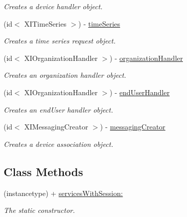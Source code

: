 \begin{DoxyCompactItemize}
\begin{DoxyCompactList}\small\item\em Creates a device handler object. \end{DoxyCompactList}\item 
(id$<$ X\+I\+Time\+Series $>$) -\/ \hyperlink{interface_x_i_session_services_internal_ac3c66084f71a5c2f7d2600b8bcb6c8c1}{time\+Series}
\begin{DoxyCompactList}\small\item\em Creates a time series request object. \end{DoxyCompactList}\item 
(id$<$ X\+I\+Organization\+Handler $>$) -\/ \hyperlink{interface_x_i_session_services_internal_a1f4dff26e7d2c196d5c71f98abff19de}{organization\+Handler}
\begin{DoxyCompactList}\small\item\em Creates an organization handler object. \end{DoxyCompactList}\item 
(id$<$ X\+I\+Organization\+Handler $>$) -\/ \hyperlink{interface_x_i_session_services_internal_af6e364386121abc42ca21dcada112fd5}{end\+User\+Handler}
\begin{DoxyCompactList}\small\item\em Creates an end\+User handler object. \end{DoxyCompactList}\item 
(id$<$ X\+I\+Messaging\+Creator $>$) -\/ \hyperlink{interface_x_i_session_services_internal_abee8df637626cbc07de4f7a3d254efbe}{messaging\+Creator}
\begin{DoxyCompactList}\small\item\em Creates a device association object. \end{DoxyCompactList}\end{DoxyCompactItemize}
\subsection*{Class Methods}
\begin{DoxyCompactItemize}
\item 
(instancetype) + \hyperlink{interface_x_i_session_services_internal_a9821bd470bc2299ba66b458301f6a9e5}{services\+With\+Session\+:}
\begin{DoxyCompactList}\small\item\em The static constructor. \end{DoxyCompactList}\end{DoxyCompactItemize}


